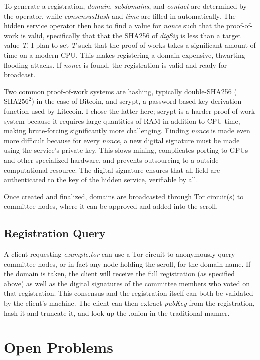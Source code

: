 \documentclass[journal]{IEEEtran}
\begin{document}
To generate a registration, \textit{domain}, \textit{subdomains}, and \textit{contact} are determined by the operator, while \textit{consensusHash} and \textit{time} are filled in automatically. The hidden service operator then has to find a value for \textit{nonce} such that the proof-of-work is valid, specifically that that the SHA256 of \textit{digSig} is less than a target value \textit{T}. I plan to set \textit{T} such that the proof-of-works takes a significant amount of time on a modern CPU. This makes registering a domain expensive, thwarting flooding attacks. If \textit{nonce} is found, the registration is valid and ready for broadcast.

Two common proof-of-work systems are hashing, typically double-SHA256 ($ \textrm{SHA}256^{{2}} $) in the case of Bitcoin, and scrypt, a password-based key derivation function used by Litecoin. I chose the latter here; scrypt is a harder proof-of-work system because it requires large quantities of RAM in addition to CPU time, making brute-forcing significantly more challenging. Finding \textit{nonce} is made even more difficult because for every \textit{nonce}, a new digital signature must be made using the service's private key. This slows mining, complicates porting to GPUs and other specialized hardware, and prevents outsourcing to a outside computational resource. The digital signature ensures that all field are authenticated to the key of the hidden service, verifiable by all.

Once created and finalized, domains are broadcasted through Tor circuit(s) to committee nodes, where it can be approved and added into the scroll.

\subsection{Registration Query}

A client requesting \textit{example.tor} can use a Tor circuit to anonymously query committee nodes, or in fact any node holding the scroll, for the domain name. If the domain is taken, the client will receive the full registration (as specified above) as well as the digital signatures of the committee members who voted on that registration. This consensus and the registration itself can both be validated by the client's machine. The client can then extract \textit{pubKey} from the registration, hash it and truncate it, and look up the .onion in the traditional manner.

\section{Open Problems}
\end{document}
